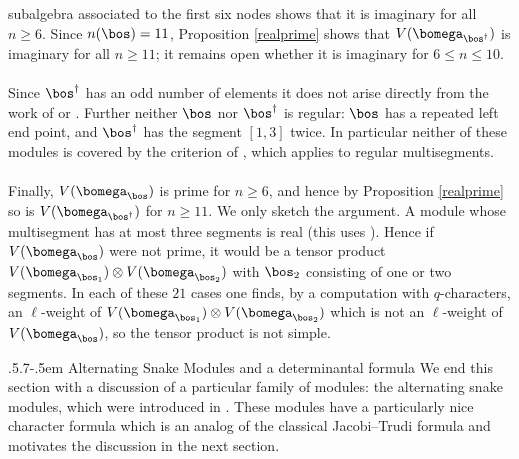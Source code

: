 \documentclass[11pt,reqno]{amsart}
\makeatletter
\theoremstyle{definition} \newtheorem*{defn}{Definition}
\theoremstyle{definition}
\numberwithin{equation}{section}
\def\subsection{\def\@secnumfont{\bfseries}\@startsection{subsection}{2}%
  {\parindent}{.5\linespacing\@plus.7\linespacing}{-.5em}%
  {\normalfont\bfseries}}
\makeatother
\begin{document}
subalgebra associated to the first six nodes shows that it is imaginary for all $n\ge6$. Since $n(\bos)=11$,
Proposition \ref{realprime} shows that $V(\bomega_{\bos^\dagger})$ is imaginary for all $n\ge11$; it remains open whether it is
imaginary for $6\le n\le 10$.
\\\\
Since $\bos^\dagger$ has an odd number of elements it does not arise directly from the work of \cite{BC23} or \cite{BM25}. Further neither $\bos$ nor $\bos^\dagger$ is regular: $\bos$ has a repeated left end point, and $\bos^\dagger$ has the segment $[1,3]$
twice. In particular neither of these modules is covered by the criterion of \cite{LM18}, which applies to regular
multisegments.
\\\\
Finally, $V(\bomega_\bos)$ is prime for $n\ge6$, and hence by Proposition \ref{realprime} so is $V(\bomega_{\bos^\dagger})$ for
$n\ge11$. We only sketch the argument. A module whose multisegment has at most three segments is real (this
uses \cite{BC25a}). Hence if $V(\bomega_\bos)$ were not prime, it would be a tensor product
$V(\bomega_{\bos_1})\otimes V(\bomega_{\bos_2})$ with $\bos_2$ consisting of one or two segments. In each of these $21$ cases
one finds, by a computation with $q$-characters, an $\ell$-weight of $V(\bomega_{\bos_1})\otimes V(\bomega_{\bos_2})$ which is not
an $\ell$-weight of $V(\bomega_\bos)$, so the tensor product is not simple.



\subsection{Alternating Snake Modules and  a determinantal formula}\label{snakesdef} We end this section with a discussion of a particular family of modules: the alternating snake modules, which were introduced in \cite{BC25a}. These modules have a particularly nice character formula which is an analog of the classical Jacobi--Trudi formula and motivates the discussion in the next section.
\end{document}
